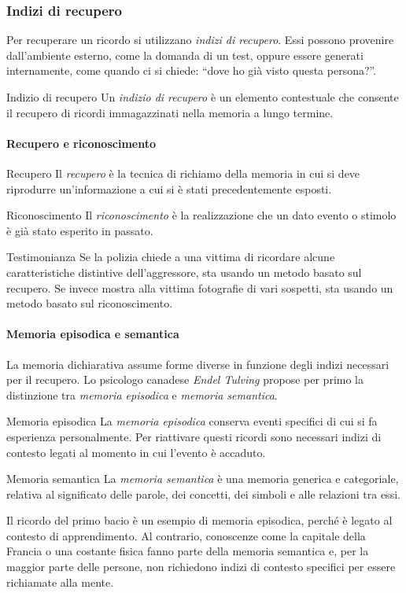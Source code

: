 \documentclass[a4paper]{article}
\begin{document}
\subsubsection{Indizi di recupero}
Per recuperare un ricordo si utilizzano \emph{indizi di recupero}. Essi possono provenire dall'ambiente esterno, come la domanda di un test, oppure essere generati internamente, come quando ci si chiede: ``dove ho già visto questa persona?''.
\begin{snippetdefinition}{Indizio di recupero}
    Un \emph{indizio di recupero} è un elemento contestuale che consente il recupero di ricordi immagazzinati nella memoria a lungo termine.
\end{snippetdefinition}
\paragraph{Recupero e riconoscimento}
\begin{snippetdefinition}{Recupero}
    Il \emph{recupero} è la tecnica di richiamo della memoria in cui si deve riprodurre un'informazione a cui si è stati precedentemente esposti.
\end{snippetdefinition}
\begin{snippetdefinition}{Riconoscimento}
    Il \emph{riconoscimento} è la realizzazione che un dato evento o stimolo è già stato esperito in passato.
\end{snippetdefinition}
\begin{snippetexample}{Testimonianza}
    Se la polizia chiede a una vittima di ricordare alcune caratteristiche distintive dell'aggressore, sta usando un metodo basato sul recupero. Se invece mostra alla vittima fotografie di vari sospetti, sta usando un metodo basato sul riconoscimento.
\end{snippetexample}
\paragraph{Memoria episodica e semantica}
La memoria dichiarativa assume forme diverse in funzione degli indizi necessari per il recupero. Lo psicologo canadese \emph{Endel Tulving} propose per primo la distinzione tra \emph{memoria episodica} e \emph{memoria semantica}.
\begin{snippetdefinition}{Memoria episodica}
    La \emph{memoria episodica} conserva eventi specifici di cui si fa esperienza personalmente. Per riattivare questi ricordi sono necessari indizi di contesto legati al momento in cui l'evento è accaduto.
\end{snippetdefinition}
\begin{snippetdefinition}{Memoria semantica}
    La \emph{memoria semantica} è una memoria generica e categoriale, relativa al significato delle parole, dei concetti, dei simboli e alle relazioni tra essi.
\end{snippetdefinition}
Il ricordo del primo bacio è un esempio di memoria episodica, perché è legato al contesto di apprendimento. Al contrario, conoscenze come la capitale della Francia o una costante fisica fanno parte della memoria semantica e, per la maggior parte delle persone, non richiedono indizi di contesto specifici per essere richiamate alla mente.
\end{document}
